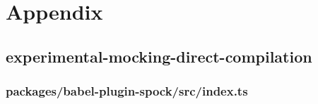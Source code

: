 \chapter*{Appendix}
\pagestyle{plain}


\section*{experimental-mocking-direct-compilation}

\subsection*{packages/babel-plugin-spock/src/index.ts}
